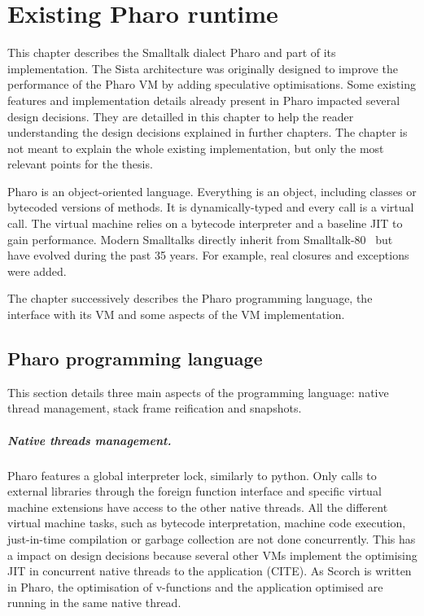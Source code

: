 \documentclass[a4paper,12pt,twoside]{../includes/ThesisStyle}
\begin{document}
\fi

\chapter{Existing Pharo runtime}
\label{chap:existing}
\minitoc

This chapter describes the Smalltalk dialect Pharo and part of its implementation. The Sista architecture was originally designed to improve the performance of the Pharo VM by adding speculative optimisations. Some existing features and implementation details already present in Pharo impacted several design decisions. They are detailled in this chapter to help the reader understanding the design decisions explained in further chapters. The chapter is not meant to explain the whole existing implementation, but only the most relevant points for the thesis. 

Pharo is an object-oriented language. Everything is an object, including classes or bytecoded versions of methods. It is dynamically-typed and every call is a virtual call. The virtual machine relies on a bytecode interpreter and a baseline JIT to gain performance. Modern Smalltalks directly inherit from Smalltalk-80~\cite{Gold83a} but have evolved during the past 35 years. For example, real closures and exceptions were added.

The chapter successively describes the Pharo programming language, the interface with its VM and some aspects of the VM implementation.

\section{Pharo programming language}

This section details three main aspects of the programming language: native thread management, stack frame reification and snapshots.

\paragraph{Native threads management.}

Pharo features a global interpreter lock, similarly to python. Only calls to external libraries through the foreign function interface and specific virtual machine extensions have access to the other native threads. All the different virtual machine tasks, such as bytecode interpretation, machine code execution, just-in-time compilation or garbage collection are not done concurrently. This has a impact on design decisions because several other VMs implement the optimising JIT in concurrent native threads to the application (CITE). As Scorch is written in Pharo, the optimisation of v-functions and the application optimised are running in the same native thread.
\end{document}
